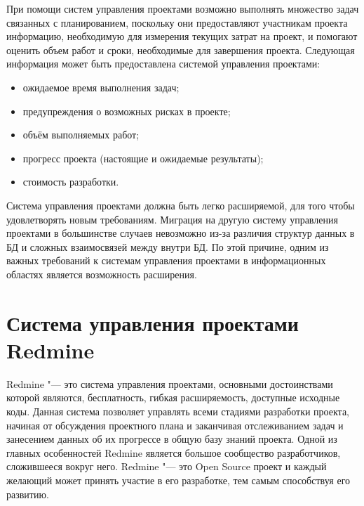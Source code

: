 При помощи систем управления проектами возможно выполнять множество задач
связанных с планированием, поскольку они предоставляют участникам проекта
информацию, необходимую для измерения текущих затрат на проект, и помогают
оценить объем работ и сроки, необходимые для завершения проекта. Следующая
информация может быть предоставлена системой управления проектами:
\begin{itemize}
  \item ожидаемое время выполнения задач;
  \item предупреждения о возможных рисках в проекте;
  \item объём выполняемых работ;
  \item прогресс проекта (настоящие и ожидаемые результаты);
  \item стоимость разработки.
\end{itemize}

Система управления проектами должна быть легко расширяемой, для того чтобы
удовлетворять новым требованиям. Миграция на другую систему управления
проектами в большинстве случаев невозможно из-за различия структур данных в БД
и сложных взаимосвязей между внутри БД. По этой причине, одним из важных
требований к системам управления проектами в информационных областях является
возможность расширения.

\section{Система управления проектами Redmine}

Redmine \cite{redmine} "--- это система управления проектами, основными
достоинствами которой являются, бесплатность, гибкая расширяемость, доступные
исходные коды. Данная система позволяет управлять всеми стадиями разработки
проекта, начиная от обсуждения проектного плана и заканчивая отслеживанием
задач и занесением данных об их прогрессе в общую базу знаний проекта. Одной из
главных особенностей Redmine является большое сообщество разработчиков,
сложившееся вокруг него. Redmine "--- это Open Source проект и каждый желающий
может принять участие в его разработке, тем самым способствуя его развитию.

